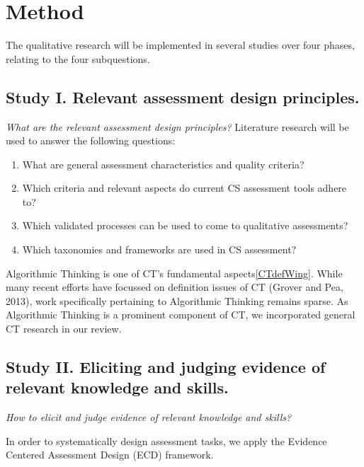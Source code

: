 \section{Method}\label{sec:method}




The qualitative research will be implemented in several studies over four phases, relating to the four subquestions.




\subsection{Study I. Relevant assessment design principles.}
\textit{What are the relevant assessment design principles?}\newline
Literature research will be used to answer the following questions:

\begin{enumerate}
\item What are general assessment characteristics and quality criteria?
\item Which criteria and relevant aspects do current CS assessment tools adhere to?
\item Which validated processes can be used to come to qualitative assessments?
\item Which taxonomies and frameworks are used in CS assessment?
\end{enumerate}

Algorithmic Thinking is one of CT's fundamental aspects\ref{CTdefWing}. While many recent efforts have focussed on definition issues of CT (Grover and Pea, 2013), work specifically pertaining to Algorithmic Thinking remains sparse. As Algorithmic Thinking is a prominent component of CT, we incorporated general CT research in our review.



\subsection{Study II. Eliciting and judging evidence of relevant knowledge and skills.}
\textit{How to elicit and judge evidence of relevant knowledge and skills?}\newline

In order to systematically design assessment tasks, we apply the Evidence Centered Assessment Design (ECD) framework.

